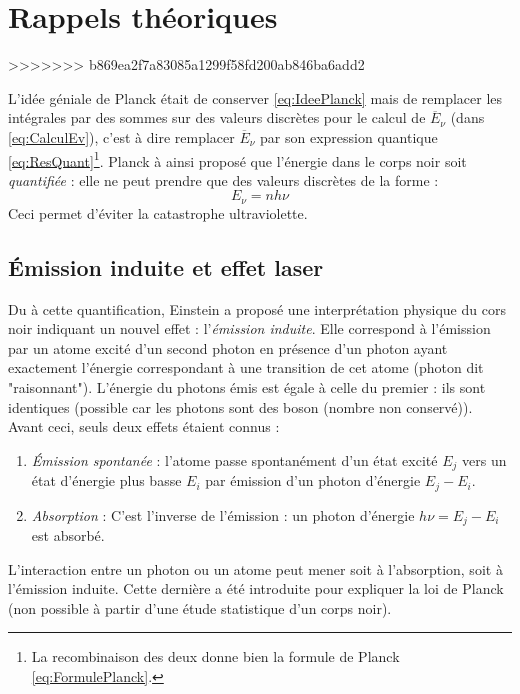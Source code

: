 \documentclass	[11pt, a4paper, openany]{book}
\begin{document}
\appendix
\chapter{Rappels théoriques}



















>>>>>>> b869ea2f7a83085a1299f58fd200ab846ba6add2

L'idée géniale de Planck était de conserver \autoref{eq:IdeePlanck} mais de remplacer les intégrales par
des sommes sur des valeurs discrètes pour le calcul de $\overline{E}_\nu$ (dans \autoref{eq:CalculEv}), 
c'est à dire remplacer $\overline{E}_\nu$ par son expression quantique \autoref{eq:ResQuant}\footnote{La 
recombinaison des deux donne bien la formule de Planck \autoref{eq:FormulePlanck}.}. Planck à ainsi proposé 
que l'énergie dans le corps noir soit \textit{quantifiée} : elle ne peut prendre que des valeurs discrètes 
de la forme :
\begin{equation}
E_\nu = nh\nu
\end{equation}
Ceci permet d'éviter la catastrophe ultraviolette.


\section{Émission induite et effet laser}
Du à cette quantification, Einstein a proposé une interprétation physique du cors noir indiquant un nouvel 
effet : l'\textit{émission induite}. Elle correspond à l'émission par un atome excité d'un second photon en 
présence d'un photon ayant exactement l'énergie correspondant à une transition de cet atome (photon dit 
"raisonnant"). L'énergie du photons émis est égale à celle du premier : ils sont identiques (possible car les
photons sont des boson (nombre non conservé)). Avant ceci, seuls deux effets étaient connus :
\begin{enumerate}
\item \textit{Émission spontanée} : l'atome passe spontanément d'un état excité $E_j$ vers un état d'énergie
plus basse $E_i$ par émission d'un photon d'énergie $E_j-E_i$.
\item \textit{Absorption} : C'est l'inverse de l'émission : un photon d'énergie $h\nu = E_j-E_i$ est 
absorbé.
\end{enumerate}
L'interaction entre un photon ou un atome peut mener soit à l'absorption, soit à l'émission induite. Cette 
dernière a été introduite pour expliquer la loi de Planck (non possible à partir d'une étude statistique d'un
corps noir).
\end{document}
